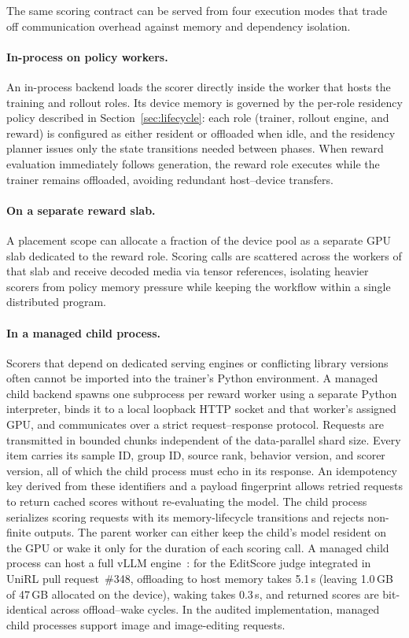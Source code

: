 The same scoring contract can be served from four execution modes that trade off communication overhead against memory and dependency isolation.

\paragraph{In-process on policy workers.}
An in-process backend loads the scorer directly inside the worker that hosts the training and rollout roles.
Its device memory is governed by the per-role residency policy described in Section~\ref{sec:lifecycle}: each role (trainer, rollout engine, and reward) is configured as either resident or offloaded when idle, and the residency planner issues only the state transitions needed between phases.
When reward evaluation immediately follows generation, the reward role executes while the trainer remains offloaded, avoiding redundant host--device transfers.

\paragraph{On a separate reward slab.}
A placement scope can allocate a fraction of the device pool as a separate GPU slab dedicated to the reward role.
Scoring calls are scattered across the workers of that slab and receive decoded media via tensor references, isolating heavier scorers from policy memory pressure while keeping the workflow within a single distributed program.

\paragraph{In a managed child process.}
Scorers that depend on dedicated serving engines or conflicting library versions often cannot be imported into the trainer's Python environment.
A managed child backend spawns one subprocess per reward worker using a separate Python interpreter, binds it to a local loopback HTTP socket and that worker's assigned GPU, and communicates over a strict request--response protocol.
Requests are transmitted in bounded chunks independent of the data-parallel shard size.
Every item carries its sample ID, group ID, source rank, behavior version, and scorer version, all of which the child process must echo in its response.
An idempotency key derived from these identifiers and a payload fingerprint allows retried requests to return cached scores without re-evaluating the model.
The child process serializes scoring requests with its memory-lifecycle transitions and rejects non-finite outputs.
The parent worker can either keep the child's model resident on the GPU or wake it only for the duration of each scoring call.
A managed child process can host a full vLLM engine~\citep{kwon2023vllm}: for the EditScore judge integrated in UniRL pull request~\#348, offloading to host memory takes 5.1\,s (leaving 1.0\,GB of 47\,GB allocated on the device), waking takes 0.3\,s, and returned scores are bit-identical across offload--wake cycles.
In the audited implementation, managed child processes support image and image-editing requests.

